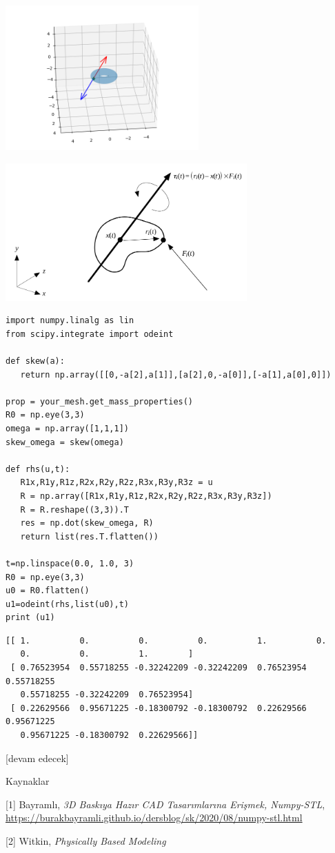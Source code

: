 \documentclass[12pt,fleqn]{article}\usepackage{../../common}
\begin{document}
\includegraphics[width=20em]{phy_005_basics_04_05.png}

\includegraphics[width=25em]{phy_008_sim_rigbod_01.png}

\begin{verbatim}
import numpy.linalg as lin
from scipy.integrate import odeint

def skew(a):
   return np.array([[0,-a[2],a[1]],[a[2],0,-a[0]],[-a[1],a[0],0]])

prop = your_mesh.get_mass_properties()
R0 = np.eye(3,3)
omega = np.array([1,1,1])
skew_omega = skew(omega)
   
def rhs(u,t):   
   R1x,R1y,R1z,R2x,R2y,R2z,R3x,R3y,R3z = u
   R = np.array([R1x,R1y,R1z,R2x,R2y,R2z,R3x,R3y,R3z])
   R = R.reshape((3,3)).T
   res = np.dot(skew_omega, R)
   return list(res.T.flatten())

t=np.linspace(0.0, 1.0, 3)
R0 = np.eye(3,3)
u0 = R0.flatten()
u1=odeint(rhs,list(u0),t)
print (u1)
\end{verbatim}

\begin{verbatim}
[[ 1.          0.          0.          0.          1.          0.
   0.          0.          1.        ]
 [ 0.76523954  0.55718255 -0.32242209 -0.32242209  0.76523954  0.55718255
   0.55718255 -0.32242209  0.76523954]
 [ 0.22629566  0.95671225 -0.18300792 -0.18300792  0.22629566  0.95671225
   0.95671225 -0.18300792  0.22629566]]
\end{verbatim}















[devam edecek]

Kaynaklar

[1] Bayramlı, {\em 3D Baskıya Hazır CAD Tasarımlarına Erişmek, Numpy-STL},
    \url{https://burakbayramli.github.io/dersblog/sk/2020/08/numpy-stl.html}

[2] Witkin, {\em Physically Based Modeling}
\end{document}
